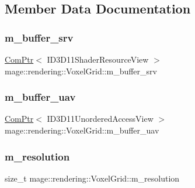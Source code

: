 \subsection{Member Data Documentation}
\hypertarget{classmage_1_1rendering_1_1_voxel_grid_ab0d154365336f1b8a9a0921cb4ade6a2}{}\label{classmage_1_1rendering_1_1_voxel_grid_ab0d154365336f1b8a9a0921cb4ade6a2} 
\subsubsection{\texorpdfstring{m\+\_\+buffer\+\_\+srv}{m\_buffer\_srv}}
{\footnotesize\ttfamily \hyperlink{namespacemage_ae74f374780900893caa5555d1031fd79}{Com\+Ptr}$<$ I\+D3\+D11\+Shader\+Resource\+View $>$ mage\+::rendering\+::\+Voxel\+Grid\+::m\+\_\+buffer\+\_\+srv\hspace{0.3cm}{\ttfamily [private]}}

\hypertarget{classmage_1_1rendering_1_1_voxel_grid_a749d37651a7aebb6ab775424508ea92d}{}\label{classmage_1_1rendering_1_1_voxel_grid_a749d37651a7aebb6ab775424508ea92d} 
\subsubsection{\texorpdfstring{m\+\_\+buffer\+\_\+uav}{m\_buffer\_uav}}
{\footnotesize\ttfamily \hyperlink{namespacemage_ae74f374780900893caa5555d1031fd79}{Com\+Ptr}$<$ I\+D3\+D11\+Unordered\+Access\+View $>$ mage\+::rendering\+::\+Voxel\+Grid\+::m\+\_\+buffer\+\_\+uav\hspace{0.3cm}{\ttfamily [private]}}

\hypertarget{classmage_1_1rendering_1_1_voxel_grid_a6f297da985b384ac6785383fd296c230}{}\label{classmage_1_1rendering_1_1_voxel_grid_a6f297da985b384ac6785383fd296c230} 
\subsubsection{\texorpdfstring{m\+\_\+resolution}{m\_resolution}}
{\footnotesize\ttfamily size\+\_\+t mage\+::rendering\+::\+Voxel\+Grid\+::m\+\_\+resolution\hspace{0.3cm}{\ttfamily [private]}}

